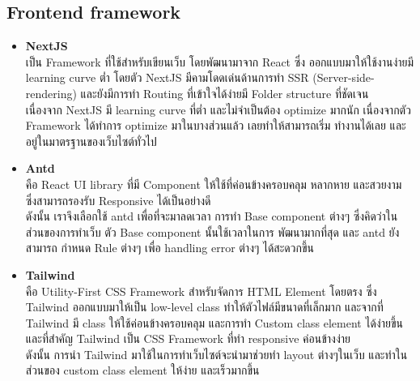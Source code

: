 \documentclass[12pt,oneside,openright,a4paper]{cpe-thai-project}
\begin{document}
\subsection{Frontend framework}
\begin{itemize}
  \item \textbf{NextJS} \\
\hspace*{1cm} เป็น Framework ที่ใช้สำหรับเขียนเว็บ โดยพัฒนามาจาก React ซึ่ง ออกแบบมาให้ใช้งานง่ายมี learning curve ต่ำ โดยตัว NextJS มีคามโดดเด่นด้านการทำ SSR (Server-side-rendering) และยังมีการทำ Routing ที่เข้าใจได้ง่ายมี Folder structure ที่ชัดเจน \\
\hspace*{1cm} เนื่องจาก NextJS มี learning curve ที่ต่ำ และไม่จำเป็นต้อง optimize มากนัก เนื่องจากตัว Framework ได้ทำการ optimize มาในบางส่วนแล้ว เลยทำให้สามารถเริ่ม ทำงานได้เลย และอยู่ในมาตรฐานของเว็บไซต์ทั่วไป
  \item \textbf{Antd} \\
\hspace*{1cm} คือ React UI library ที่มี  Component ให้ใช้ที่ค่อนข้างครอบคลุม หลากหาย และสวยงาม ซึ่งสามารถรองรับ Responsive ได้เป็นอย่างดี \\
\hspace*{1cm} ดังนั้น เราจึงเลือกใช้ antd เพื่อที่จะมาลดเวลา การทำ Base component ต่างๆ ซึ่งคิดว่าในส่วนของการทำเว็บ ตัว Base component นั้นใช้เวลาในการ พัฒนามากที่สุด และ antd ยังสามารถ กำหนด Rule ต่างๆ เพื่อ handling error ต่างๆ ได้สะดวกขึ้น
  \item \textbf{Tailwind} \\
\hspace*{1cm} คือ Utility-First CSS Framework สำหรับจัดการ HTML Element โดยตรง ซึ่ง Tailwind ออกแบบมาให้เป็น low-level class ทำให้ตัวไฟล์มีขนาดที่เล็กมาก และจากที่ Tailwind มี class ให้ใช้ค่อนข้างครอบคลุม และการทำ Custom class element ได้ง่ายขึ้น และที่สำคัญ Tailwind เป็น CSS Framework ที่ทำ responsive ค่อนข้างง่าย \\
\hspace*{1cm} ดังนั้น การนำ Tailwind มาใช้ในการทำเว็บไซต์จะนำมาช่วยทำ layout ต่างๆในเว็บ และทำในส่วนของ custom class element ให้ง่าย และเร็วมากขึ้น
\end{itemize}
\end{document}
